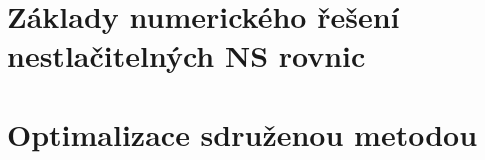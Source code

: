 
\chapter{Základy numerického řešení nestlačitelných NS rovnic}



\chapter{Optimalizace sdruženou metodou}






